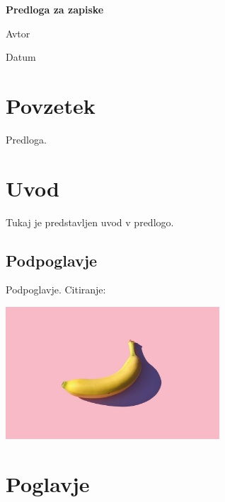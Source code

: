 \documentclass[a4paper, 12pt]{book}
\title{\ttitle}
\author{\tauthor}
\date{\tdate}
\newcommand{\ttitle}{Predloga za zapiske}
\newcommand{\tauthor}{Avtor}
\newcommand{\tdate}{Datum}
\theoremstyle{definition}
\theoremstyle{remark}
\newcommand\mymaketitle{
  \begin{titlepage}
    \begin{center}
        \vspace*{4cm}
        \Huge
        \textbf{\ttitle}
                        
        \vspace{1.5cm}
        \huge
        \tauthor
            
        \vspace{3cm}
        \Large
        \tdate
    \end{center}
  \end{titlepage}
}
\begin{document}
\frontmatter
\setcounter{page}{1}
\renewcommand{\thepage}{}
\newcommand{\sn}[1]{"`#1"'}

\mymaketitle


\pagestyle{empty}
\def\thepage{}
\tableofcontents{}

\def\x{\hspace{3ex}}    %
\def\y{\hspace{2.45ex}}  %
\def\z{\hspace{1.9ex}}    %
\stackMath

\cleardoublepage
{}
{}
\chapter*{Povzetek}

Predloga.

\newpage




\mainmatter
\setcounter{page}{1}
\pagestyle{fancy}

\chapter{Uvod}

Tukaj je predstavljen uvod v predlogo.


\section{Podpoglavje}

Podpoglavje. Citiranje: \cite{lamport1985latex}

\includegraphics[width=0.6\textwidth]{pic.jpg}

\lipsum



\chapter{Poglavje}



\cleardoublepage
{}
{}


\end{document}
